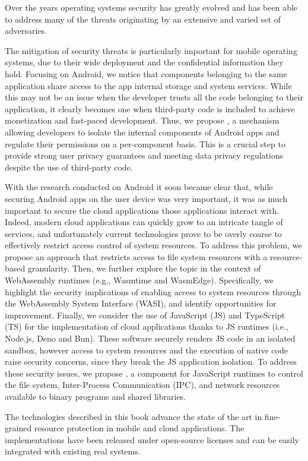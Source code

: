 Over the years operating systems security has greatly evolved and has
been able to address many of the threats originating by an extensive
and varied set of adversaries.

The mitigation of security threats is particularly important for
mobile operating systems, due to their wide deployment and the
confidential information they hold. Focusing on Android, we notice
that components belonging to the same application share access to the
app internal storage and system services. While this may not be an
issue when the developer trusts all the code belonging to their
application, it clearly becomes one when third-party code is included
to achieve monetization and fast-paced development. Thus, we propose
\seapp, a mechanism allowing developers to isolate the internal
components of Android apps and regulate their permissions on a
per-component basis. This is a crucial step to provide strong user
privacy guarantees and meeting data privacy regulations despite the
use of third-party code.

With the research conducted on Android it soon became clear that,
while securing Android apps on the user device was very important,
it was as much important to secure the cloud applications those
applications interact with. Indeed, modern cloud applications can
quickly grow to an intricate tangle of services, and unfortunately
current technologies prove to be overly coarse to effectively restrict
access control of system resources. To address this problem, we propose
an approach that restricts access to file system resources with a
resource-based granularity. Then, we further explore the topic in the
context of WebAssembly runtimes (e.g., Wasmtime and WasmEdge).
Specifically, we highlight the security implications of enabling
access to system resources through the WebAssembly System Interface
(WASI), and identify opportunities for improvement.
Finally, we consider the use of JavaScript (JS) and TypeScript (TS)
for the implementation of cloud applications thanks to JS runtimes
(i.e., Node.js, Deno and Bun). These software securely renders JS code
in an isolated sandbox, however access to system resources and the
execution of native code raise security concerns, since they break the
JS application isolation. To address these security issues, we propose
\natisand, a component for JavaScript runtimes to control the
file system, Inter-Process Communication (IPC), and network resources
available to binary programs and shared libraries.

The technologies described in this book advance the state of the art
in fine-grained resource protection in mobile and cloud applications.
The implementations have been released under open-source licenses and
can be easily integrated with existing real systems.
